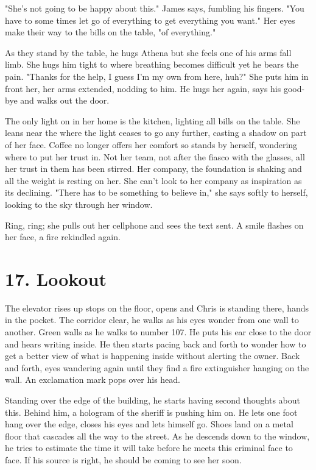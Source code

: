         "She's not going to be happy about this." James says, fumbling his fingers. "You have to some times let go of everything to get everything
    you want." Her eyes make their way to the bills on the table, "of everything." 

        As they stand by the table, he hugs Athena but she feels one of his arms fall limb. She hugs him tight to where breathing becomes 
    difficult yet he bears the pain. "Thanks for the help, I guess I'm my own from here, huh?" She puts him in front her, her arms extended, 
    nodding to him. He hugs her again, says his good-bye and walks out the door. 

        The only light on in her home is the kitchen, lighting all bills on the table. She leans near the where the light ceases to go any
    further, casting a shadow on part of her face. Coffee no longer offers her comfort so stands by herself, wondering where to put her trust
    in. Not her team, not after the fiasco with the glasses, all her trust in them has been stirred. Her company, the foundation is shaking and
    all the weight is resting on her. She can't look to her company as inspiration as its declining. "There has to be something to believe in,"
    she says softly to herself, looking to the sky through her window.

        Ring, ring; she pulls out her cellphone and sees the text sent. A smile flashes on her face, a fire rekindled again. 

\section{17. Lookout}

        The elevator rises up stops on the floor, opens and Chris is standing there, hands in the pocket. The corridor clear, he walks as his
    eyes wonder from one wall to another. Green walls as he walks to number 107. He puts his ear close to the door and hears writing inside.
    He then starts pacing back and forth to wonder how to get a better view of what is happening inside without alerting the owner. Back and
    forth, eyes wandering again until they find a fire extinguisher hanging on the wall. An exclamation mark pops over his head.

        Standing over the edge of the building, he starts having second thoughts about this. Behind him, a hologram of the sheriff is pushing
    him on. He lets one foot hang over the edge, closes his eyes and lets himself go. Shoes land on a metal floor that cascades all the way
    to the street. As he descends down to the window, he tries to estimate the time it will take before he meets this criminal face to face. If
    his source is right, he should be coming to see her soon.


